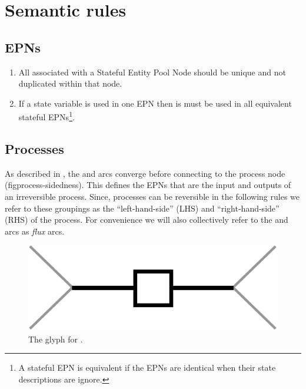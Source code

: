 \section{Semantic rules}

\subsection{EPNs}

 \begin{enumerate}
   \item All  associated with a Stateful Entity Pool Node should be unique and not duplicated within that node.
   \item If a state variable is used in one EPN then is must be used in all equivalent stateful EPNs\footnote{A stateful EPN is equivalent if the EPNs are identical when their state descriptions are ignore.}.
  \end{enumerate}

\subsection{Processes}

As described in , the  and  arcs converge before connecting to the process node (fig{process-sidedness}). This defines the EPNs that are the input and outputs of an irreversible process. Since, processes can be reversible in the following rules we refer to these groupings as the ``left-hand-side'' (LHS) and ``right-hand-side'' (RHS) of the process. For convenience we will also collectively refer to the  and  arcs as \emph{flux} arcs.

\begin{figure}[H]
  \centering
  \includegraphics[scale = 0.4]{images/process}
  \caption{The \PD glyph for .}
  \label{fig:process-sidedness}
\end{figure}

